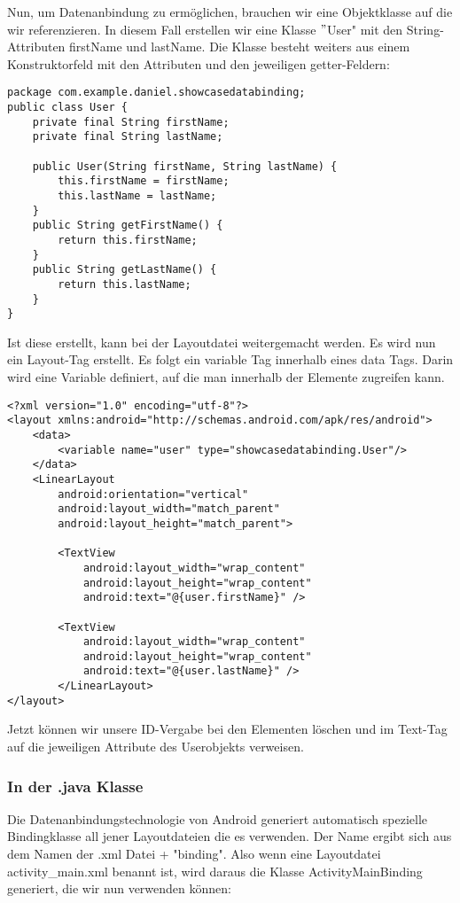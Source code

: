 \documentclass[FIPLY_base.tex]{subfiles}
\begin{document}
Nun, um Datenanbindung zu ermöglichen, brauchen wir eine Objektklasse auf die wir referenzieren. In diesem Fall erstellen wir eine Klasse $"$User" mit den String-Attributen firstName und lastName. Die Klasse besteht weiters aus einem Konstruktorfeld mit den Attributen und den jeweiligen getter-Feldern: 

\begin{lstlisting}[caption={Unsere Objektklasse die bei der Datenanbindung referenziert wird.},label=DescriptiveLabel]
package com.example.daniel.showcasedatabinding;
public class User {
    private final String firstName;
    private final String lastName;

    public User(String firstName, String lastName) {
        this.firstName = firstName;
        this.lastName = lastName;
    }
    public String getFirstName() {
        return this.firstName;
    }
    public String getLastName() {
        return this.lastName;
    }
}
\end{lstlisting}

Ist diese erstellt, kann bei der Layoutdatei weitergemacht werden. Es wird nun ein Layout-Tag erstellt. Es folgt ein variable Tag innerhalb eines data Tags. Darin wird eine Variable definiert, auf die man innerhalb der Elemente zugreifen kann.

\begin{lstlisting}[caption={Die XML Datei nach der Integration einer Datenanbindung.},label=DescriptiveLabel]
<?xml version="1.0" encoding="utf-8"?>
<layout xmlns:android="http://schemas.android.com/apk/res/android">
    <data>
	    <variable name="user" type="showcasedatabinding.User"/>
    </data>
    <LinearLayout
	    android:orientation="vertical"
	    android:layout_width="match_parent"
	    android:layout_height="match_parent">
    
	    <TextView
	        android:layout_width="wrap_content"
	        android:layout_height="wrap_content"
	        android:text="@{user.firstName}" />
		    
	    <TextView
	        android:layout_width="wrap_content"
	        android:layout_height="wrap_content"
	        android:text="@{user.lastName}" />
	    </LinearLayout>
</layout>
\end{lstlisting}


Jetzt können wir unsere ID-Vergabe bei den Elementen löschen und im Text-Tag auf die jeweiligen Attribute des Userobjekts verweisen.

\newpage
\subsubsection{In der .java Klasse}
Die Datenanbindungstechnologie von Android generiert automatisch spezielle Bindingklasse all jener Layoutdateien die es verwenden. Der Name ergibt sich aus dem Namen der .xml Datei + "binding". Also wenn eine Layoutdatei activity\_main.xml benannt ist, wird daraus die Klasse ActivityMainBinding generiert, die wir nun verwenden können:
\end{document}
